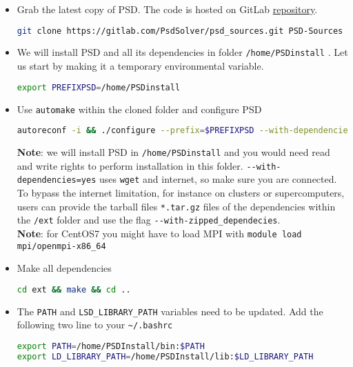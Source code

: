 \begin{itemize}
\item
  Grab the latest copy of PSD. The code is hosted on GitLab
  \href{https://gitlab.com/PsdSolver/psd_sources}{repository}.

\begin{lstlisting}[language=bash]
git clone https://gitlab.com/PsdSolver/psd_sources.git PSD-Sources
\end{lstlisting}
\item
  We will install PSD and all its dependencies in folder
  \lstinline!/home/PSDinstall! . Let us start by making it a temporary
  environmental variable.

\begin{lstlisting}[language=bash]
export PREFIXPSD=/home/PSDinstall
\end{lstlisting}
\item
  Use \lstinline!automake! within the cloned folder and configure PSD

\begin{lstlisting}[language=bash]
autoreconf -i && ./configure --prefix=$PREFIXPSD --with-dependencies=yes
\end{lstlisting}

  \textbf{Note}: we will install PSD in \lstinline!/home/PSDinstall! and
  you would need read and write rights to perform installation in this
  folder. \lstinline!--with-dependencies=yes! uses \lstinline!wget! and
  internet, so make sure you are connected. To bypass the internet
  limitation, for instance on clusters or supercomputers, users can
  provide the tarball files \lstinline!*.tar.gz! files of the
  dependencies within the \lstinline!/ext! folder and use the flag
  \lstinline!--with-zipped_dependecies!.\\
  \textbf{Note}: for CentOS7 you might have to load MPI with
  \lstinline!module load mpi/openmpi-x86_64!
\item
  Make all dependencies

\begin{lstlisting}[language=bash]
cd ext && make && cd ..
\end{lstlisting}
\item
  The \lstinline!PATH! and \lstinline!LSD_LIBRARY_PATH! variables need
  to be updated. Add the following two line to your
  \lstinline!~/.bashrc!

\begin{lstlisting}[language=bash]
export PATH=/home/PSDInstall/bin:$PATH 
export LD_LIBRARY_PATH=/home/PSDInstall/lib:$LD_LIBRARY_PATH
\end{lstlisting}


\end{itemize}

